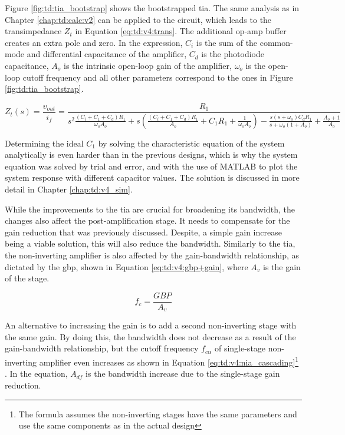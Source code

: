 Figure \ref{fig:td:tia_bootstrap} shows the bootstrapped \gls{tia}. The same analysis as in Chapter \ref{chap:td:calc:v2} can be applied to the circuit, which leads to the transimpedance $Z_t$ in Equation \eqref{eq:td:v4:trans}. The additional op-amp buffer creates an extra pole and zero. In the expression, $C_i$ is the sum of the common-mode and differential capacitance of the amplifier, $C_d$ is the photodiode capacitance, $A_o$ is the intrinsic open-loop gain of the amplifier, $\omega_o$ is the open-loop cutoff frequency and all other parameters correspond to the ones in Figure \ref{fig:td:tia_bootstrap}.

\begin{equation}\label{eq:td:v4:trans}
	Z_t(s) = \frac{v_{out}}{i_f} = \frac{R_1}{s^2\frac{\left(C_i + C_1 + C_d\right)R_1}{\omega_oA_o} + s\left(\frac{\left(C_i + C_1 + C_d\right)R_1}{A_o} + C_1R_1 + \frac{1}{\omega_oA_o}\right) - \frac{s\left(s + \omega_o\right)C_dR_1}{s + \omega_o(1 + A_o)} + \frac{A_o + 1}{A_o}}
\end{equation}

Determining the ideal $C_1$ by solving the characteristic equation of the system analytically is even harder than in the previous designs, which is why the system equation was solved by trial and error, and with the use of MATLAB to plot the system response with different capacitor values. The solution is discussed in more detail in Chapter \ref{chap:td:v4_sim}.

While the improvements to the \gls{tia} are crucial for broadening its bandwidth, the changes also affect the post-amplification stage. It needs to compensate for the gain reduction that was previously discussed. Despite, a simple gain increase being a viable solution, this will also reduce the bandwidth. Similarly to the \gls{tia}, the non-inverting amplifier is also affected by the gain-bandwidth relationship, as dictated by the \gls{gbp}, shown in Equation \eqref{eq:td:v4:gbp+gain}, where $A_v$ is the gain of the stage.

\begin{equation}\label{eq:td:v4:gbp+gain}
	f_c = \frac{GBP}{A_v}
\end{equation}

An alternative to increasing the gain is to add a second non-inverting stage with the same gain. By doing this, the bandwidth does not decrease as a result of the gain-bandwidth relationship, but the cutoff frequency $f_{c\alpha}$ of single-stage non-inverting amplifier even increases as shown in Equation \eqref{eq:td:v4:nia_cascading}\footnote{The formula assumes the non-inverting stages have the same parameters and use the same components as in the actual design} \cite{ti2020cascading}. In the equation, $A_{df}$ is the bandwidth increase due to the single-stage gain reduction.

